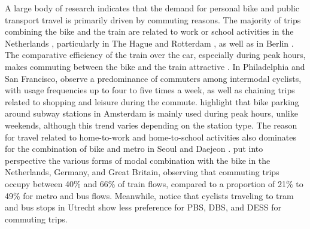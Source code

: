 \begin{refsegment}
A large body of research indicates that the demand for personal bike and public transport travel is primarily driven by commuting reasons. The majority of trips combining the bike and the train are related to work or school activities in the Netherlands \textcolor{blue}{\autocite[15]{shelat_analysing_2018}}, particularly in The Hague and Rotterdam \textcolor{blue}{\autocites[16]{la_paix_puello_train_2016}[8]{jonkeren_bicycle_2021}}, as well as in Berlin \textcolor{blue}{\autocite[78]{oostendorp_combining_2018}}. The comparative efficiency of the train over the car, especially during peak hours, makes commuting between the bike and the train attractive \textcolor{blue}{\autocite[63]{papon_rapport_2015}}. In Philadelphia and San Francisco, \textcolor{blue}{\textcite[104]{flamm_public_2014}} observe a predominance of commuters among intermodal cyclists, with usage frequencies up to four to five times a week, as well as chaining trips related to shopping and leisure during the commute. \textcolor{blue}{\textcite[344]{kampen_bicycle_2021}} highlight that bike parking around subway stations in Amsterdam is mainly used during peak hours, unlike weekends, although this trend varies depending on the station type. The reason for travel related to home-to-work and home-to-school activities also dominates for the combination of bike and metro in Seoul and Daejeon \textcolor{blue}{\autocite[46]{lee_strategies_2010}}. \textcolor{blue}{\textcite[288]{martens_bicycle_2004}} put into perspective the various forms of modal combination with the bike in the Netherlands, Germany, and Great Britain, observing that commuting trips occupy between 40\% and 66\% of train flows, compared to a proportion of 21\% to 49\% for metro and bus flows. Meanwhile, \textcolor{blue}{\textcite[291]{kuijk_preferences_2022}} notice that cyclists traveling to tram and bus stops in Utrecht show less preference for \acrshort{PBS}, \acrshort{DBS}, and \acrshort{DESS} for commuting trips.%


\end{refsegment}
